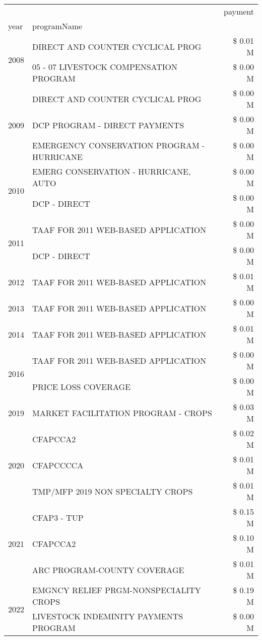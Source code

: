 \begin{tabular}{llr}
\toprule
 &  & payment \\
year & programName &  \\
\midrule
\multirow[t]{2}{*}{2008} & DIRECT AND COUNTER CYCLICAL PROG & \$ 0.01 M \\
 & 05 - 07 LIVESTOCK COMPENSATION PROGRAM & \$ 0.00 M \\
\cline{1-3}
\multirow[t]{3}{*}{2009} & DIRECT AND COUNTER CYCLICAL PROG & \$ 0.00 M \\
 & DCP PROGRAM - DIRECT PAYMENTS & \$ 0.00 M \\
 & EMERGENCY CONSERVATION PROGRAM - HURRICANE & \$ 0.00 M \\
\cline{1-3}
\multirow[t]{2}{*}{2010} & EMERG CONSERVATION - HURRICANE, AUTO & \$ 0.00 M \\
 & DCP - DIRECT & \$ 0.00 M \\
\cline{1-3}
\multirow[t]{2}{*}{2011} & TAAF FOR 2011 WEB-BASED APPLICATION & \$ 0.00 M \\
 & DCP - DIRECT & \$ 0.00 M \\
\cline{1-3}
2012 & TAAF FOR 2011 WEB-BASED APPLICATION & \$ 0.01 M \\
\cline{1-3}
2013 & TAAF FOR 2011 WEB-BASED APPLICATION & \$ 0.00 M \\
\cline{1-3}
2014 & TAAF FOR 2011 WEB-BASED APPLICATION & \$ 0.01 M \\
\cline{1-3}
\multirow[t]{2}{*}{2016} & TAAF FOR 2011 WEB-BASED APPLICATION & \$ 0.00 M \\
 & PRICE LOSS COVERAGE & \$ 0.00 M \\
\cline{1-3}
2019 & MARKET FACILITATION PROGRAM - CROPS & \$ 0.03 M \\
\cline{1-3}
\multirow[t]{3}{*}{2020} & CFAPCCA2 & \$ 0.02 M \\
 & CFAPCCCCA & \$ 0.01 M \\
 & TMP/MFP 2019 NON SPECIALTY CROPS & \$ 0.01 M \\
\cline{1-3}
\multirow[t]{3}{*}{2021} & CFAP3 - TUP & \$ 0.15 M \\
 & CFAPCCA2 & \$ 0.10 M \\
 & ARC PROGRAM-COUNTY COVERAGE & \$ 0.01 M \\
\cline{1-3}
\multirow[t]{2}{*}{2022} & EMGNCY RELIEF PRGM-NONSPECIALITY CROPS & \$ 0.19 M \\
 & LIVESTOCK INDEMINITY PAYMENTS PROGRAM & \$ 0.00 M \\
\cline{1-3}
\bottomrule
\end{tabular}
